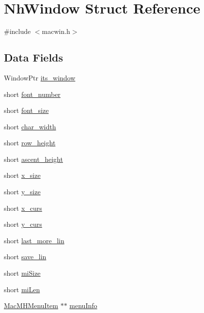 \hypertarget{structNhWindow}{\section{Nh\+Window Struct Reference}
\label{structNhWindow}
}


{\ttfamily \#include $<$macwin.\+h$>$}

\subsection*{Data Fields}
\begin{DoxyCompactItemize}
\item 
Window\+Ptr \hyperlink{structNhWindow_a68dc7295b79e14f4a78a0040c15888e5}{its\+\_\+window}
\item 
short \hyperlink{structNhWindow_a69b70dabcb069d8584b5bdf7acb31a61}{font\+\_\+number}
\item 
short \hyperlink{structNhWindow_a2748f3b69f3d3e42fdaf8171cbbdb367}{font\+\_\+size}
\item 
short \hyperlink{structNhWindow_a6744c3a07c381cf7a485b336d7e30755}{char\+\_\+width}
\item 
short \hyperlink{structNhWindow_a2df8c3e9deac0c0d0a5d9793b7470055}{row\+\_\+height}
\item 
short \hyperlink{structNhWindow_ad5549ce4698cc7698236146ebee4c2a9}{ascent\+\_\+height}
\item 
short \hyperlink{structNhWindow_a10d785f6f3a83f1148b0cfee07fd71ef}{x\+\_\+size}
\item 
short \hyperlink{structNhWindow_ace64e7fc7598255924aaa8334766feff}{y\+\_\+size}
\item 
short \hyperlink{structNhWindow_ab56661eb993dd6ee08d94c6d81175452}{x\+\_\+curs}
\item 
short \hyperlink{structNhWindow_a1ce884e1926c5e62d509589c419c0b80}{y\+\_\+curs}
\item 
short \hyperlink{structNhWindow_a0645528f32a19a8be138755283ffe5fe}{last\+\_\+more\+\_\+lin}
\item 
short \hyperlink{structNhWindow_a5df57289ac1b5436228829358f8f9f38}{save\+\_\+lin}
\item 
short \hyperlink{structNhWindow_adf87c11968010efad19a04910e5cb890}{mi\+Size}
\item 
short \hyperlink{structNhWindow_ad3a28bda1cad1fb265f19d598da63cf5}{mi\+Len}
\item 
\hyperlink{structMacMHMenuItem}{Mac\+M\+H\+Menu\+Item} $\ast$$\ast$ \hyperlink{structNhWindow_a89047d040986f9093c06241a64f5c6ee}{menu\+Info}
$$
\end{DoxyCompactItemize}
